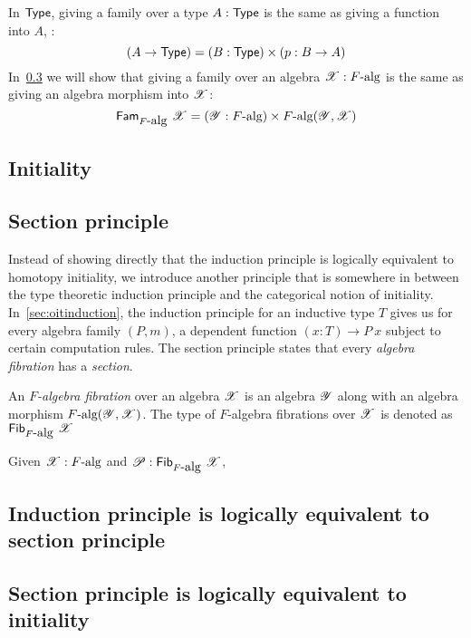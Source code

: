 \documentclass[a4paper,10pt]{article}
\begin{document}
In $\mathsf{Type}$, giving a family over a type $A : \mathsf{Type}$ is the same as
giving a function into $A$, \ie:
$$
(A \to \mathsf{Type}) = (B : \mathsf{Type}) \times (p : B \to A)
$$
In~\cref{sec:oitsectioninduction} we will show that giving a
family over an algebra $\mathscr{X} : F\mbox{-alg}$ is the same as giving an
algebra morphism into $\mathscr{X}$:
$$
\mathsf{Fam}_{F\mbox{-alg}}\ \mathscr{X} = (\mathscr{Y} : F\mbox{-alg}) \times F\mbox{-alg}(\mathscr{Y},\mathscr{X})
$$

\subsection{Initiality}
\label{sec:oitinitiality}

\subsection{Section principle}
\label{sec:oitsection}

Instead of showing directly that the induction principle is logically
equivalent to homotopy initiality, we introduce another principle that
is somewhere in between the type theoretic induction principle and the
categorical notion of initiality. In~\cref{sec:oitinduction}, the
induction principle for an inductive type $T$ gives us for every
algebra family $(P,m)$, a dependent function $(x : T) \to P\ x$
subject to certain computation rules. The section principle states
that every \emph{algebra fibration} has a \emph{section}.

\begin{defn}
  An \emph{$F$-algebra fibration} over an algebra $\mathscr{X}$ is an
  algebra $\mathscr{Y}$ along with an algebra morphism
  $F\mbox{-alg}(\mathscr{Y},\mathscr{X})$. The type of $F$-algebra fibrations
  over $\mathscr{X}$ is denoted as $\mathsf{Fib}_{F\mbox{-alg}}\ \mathscr{X}$
\end{defn}

\begin{defn}
  Given $\mathscr{X} : F\mbox{-alg}$ and $\mathscr{P} : \mathsf{Fib}_{F\mbox{-alg}}\ \mathscr{X}$,
\end{defn}


\subsection{Induction principle is logically equivalent to section principle}
\label{sec:oitsectioninduction}

\subsection{Section principle is logically equivalent to initiality}
\label{sec:oitsectioninitiality}
\end{document}

